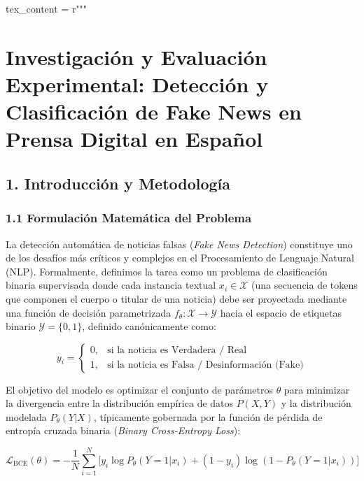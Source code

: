 tex_content = r"""%

\chapter*{Investigación y Evaluación Experimental: Detección y Clasificación de Fake News en Prensa Digital en Español}

\section*{1. Introducción y Metodología}

\subsection*{1.1 Formulación Matemática del Problema}

La detección automática de noticias falsas (\textit{Fake News Detection}) constituye uno de los desafíos más críticos y complejos en el Procesamiento de Lenguaje Natural (NLP). Formalmente, definimos la tarea como un problema de clasificación binaria supervisada donde cada instancia textual $x_i \in \mathcal{X}$ (una secuencia de tokens que componen el cuerpo o titular de una noticia) debe ser proyectada mediante una función de decisión parametrizada $f_\theta: \mathcal{X} \to \mathcal{Y}$ hacia el espacio de etiquetas binario $\mathcal{Y} = \{0, 1\}$, definido canónicamente como:

\begin{equation}
y_i = \begin{cases} 
0, & \text{si la noticia es Verdadera / Real} \\ 
1, & \text{si la noticia es Falsa / Desinformación (Fake)} 
\end{cases}
\end{equation}

El objetivo del modelo es optimizar el conjunto de parámetros $\theta$ para minimizar la divergencia entre la distribución empírica de datos $P(X, Y)$ y la distribución modelada $P_\theta(Y|X)$, típicamente gobernada por la función de pérdida de entropía cruzada binaria (\textit{Binary Cross-Entropy Loss}):

\begin{equation}
\mathcal{L}_{\text{BCE}}(\theta) = -\frac{1}{N} \sum_{i=1}^N \Big[ y_i \log P_\theta(Y=1|x_i) + (1 - y_i) \log(1 - P_\theta(Y=1|x_i)) \Big]
\end{equation}

